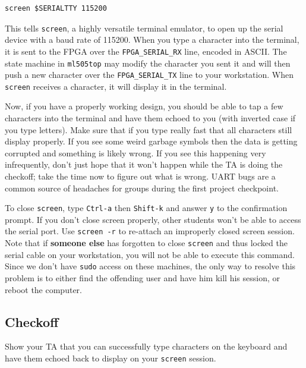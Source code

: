 \documentclass[11pt]{article}
\begin{document}
\begin{verbatim}
screen $SERIALTTY 115200
\end{verbatim}

This tells \verb|screen|, a highly versatile terminal emulator, to open up the serial device with a baud rate of 115200. When you type a character into the terminal, it is sent to the FPGA over the \verb|FPGA_SERIAL_RX| line, encoded in ASCII. The state machine in \verb|ml505top| may modify the character you sent it and will then push a new character over the \verb|FPGA_SERIAL_TX| line to your workstation. When \verb|screen| receives a character, it will display it in the terminal.

Now, if you have a properly working design, you should be able to tap a few characters into the terminal and have them echoed to you (with inverted case if you type letters). Make sure that if you type really fast that all characters still display properly. If you see some weird garbage symbols then the data is getting corrupted and something is likely wrong. If you see this happening very infrequently, don't just hope that it won't happen while the TA is doing the checkoff; take the time now to figure out what is wrong. UART bugs are a common source of headaches for groups during the first project checkpoint. 

To close \verb|screen|, type \verb|Ctrl-a| then \verb|Shift-k| and answer \verb|y| to the confirmation prompt. If you don't close screen properly, other students won't be able to access the serial port. Use \verb|screen -r| to re-attach an improperly closed screen session. Note that if \textbf{someone else} has forgotten to close \verb|screen| and thus locked the serial cable on your workstation, you will not be able to execute this command. Since we don’t have \verb|sudo| access on these machines, the only way to resolve this problem is to either find the offending user and have him kill his session, or reboot the computer.

\subsection{Checkoff}
Show your TA that you can successfully type characters on the keyboard and have them echoed back to display on your \verb|screen| session.
\end{document}

